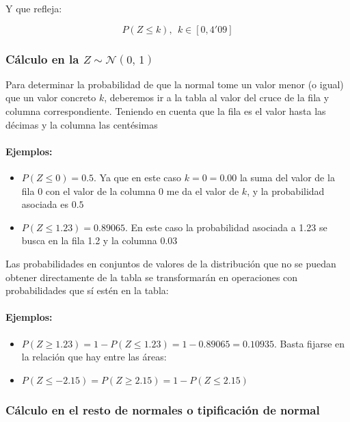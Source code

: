 Y que refleja:

$$P\left(Z\leq k \right), \ \  k \in \left[ 0 , 4'09 \right]$$
\begin{center}
    
\end{center}

\subsubsection{Cálculo en la $Z \sim \mathcal{N}(0,\,1)$}
Para determinar la probabilidad de que la normal tome un valor menor (o igual) que un valor concreto $k$, deberemos ir a la tabla al valor del cruce de la fila y columna correspondiente. Teniendo en cuenta que la fila es el valor hasta las décimas y la columna las centésimas
\paragraph{Ejemplos:} 
\begin{itemize}
    \item $P\left(Z\leq 0 \right)=0.5 $. Ya que en este caso $k=0=0.00$ la suma del valor de la fila 0 con el valor de la columna 0 me da el valor de $k$, y la probabilidad asociada es $0.5$
    \item $P\left(Z\leq 1.23 \right)= 0.89065$. En este caso la probabilidad asociada a 1.23 se busca en la fila 1.2 y la columna 0.03 
\end{itemize}


Las probabilidades en conjuntos de valores de la distribución que no se puedan obtener directamente de la tabla se transformarán en operaciones con probabilidades que sí estén en la tabla:

\paragraph{Ejemplos:}
\begin{itemize}
    \item $P\left(Z\geq 1.23 \right)= 1 - P\left(Z\leq 1.23 \right) = 1 - 0.89065= 0.10935$. Basta fijarse en la relación que hay entre las áreas: 
    \begin{center}
        
        
        
    \end{center}
    \item  $P\left(Z\leq -2.15 \right)=P\left(Z\geq 2.15 \right)=1-P\left(Z\leq 2.15 \right)$
\end{itemize}



\subsubsection{Cálculo en el resto de normales o tipificación de normal}

%










